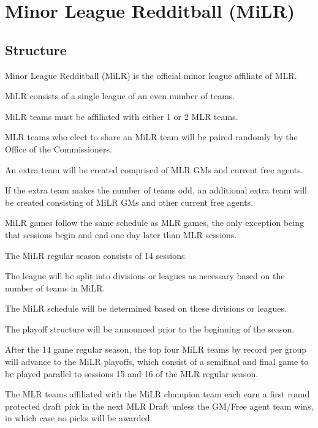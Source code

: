 
\section{Minor League Redditball (MiLR)}

\subsection{Structure}
\begin{deepEnumerate}
	\item Minor League Redditball (MiLR) is the official minor league affiliate of MLR.
	\item MiLR consists of a single league of an even number of teams.
	\begin{deepEnumerate}
        \item MiLR teams must be affiliated with either 1 or 2 MLR teams.
        \begin{deepEnumerate}
            \item MLR teams who elect to share an MiLR team will be paired randomly by the Office of the Commissioners.
            \item An extra team will be created comprised of MLR GMs and current free agents.
            \item If the extra team makes the number of teams odd, an additional extra team will be created consisting of MiLR GMs and other current free agents.
        \end{deepEnumerate} 
    \end{deepEnumerate}
	\item MiLR games follow the same schedule as MLR games, the only exception being that sessions begin and end one day later than MLR sessions.
    \item The MiLR regular season consists of 14 sessions. 
    \item The league will be split into divisions or leagues as necessary based on the number of teams in MiLR.
    \begin{deepEnumerate}
        \item The MiLR schedule will be determined based on these divisions or leagues.
        \item The playoff structure will be announced prior to the beginning of the season.
    \end{deepEnumerate}
	\item After the 14 game regular season, the top four MiLR teams by record per group will advance to the MiLR playoffs, 
	which consist of a semifinal and final game to be played parallel to sessions 15 and 16 of the MLR regular season.
	\item The MLR teams affiliated with the MiLR champion team each earn a first round protected draft pick in the next MLR Draft 
	unless the GM/Free agent team wins, in which case no picks will be awarded.
\end{deepEnumerate}

